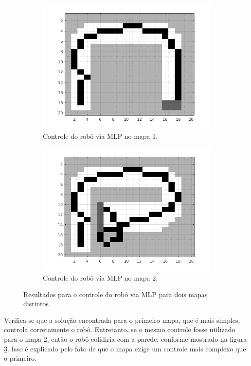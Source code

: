 	\begin{figure}[h!]
	
	\centering
	
		\begin{subfigure}{.5\textwidth}
		  \centering
		  \includegraphics[width=1\linewidth]{mlp_robot/mlp_1_2}
		  \caption{\centering Controle do robô via MLP no mapa 1.}
		  \label{fig:mlp_2_1}
		  
		\end{subfigure}%
		\begin{subfigure}{.5\textwidth}
		  \centering
		  \includegraphics[width=1\linewidth]{mlp_robot/mlp_2_2}
		  \caption{\centering Controle do robô via MLP no mapa 2.}
		  \label{fig:mlp_2_2} 
		\end{subfigure}
	
	
	\caption{Resultados para o controle do robô via MLP
	para dois mapas distintos.}
	\end{figure} 
	
	\FloatBarrier
	
Verifica-se que a solução encontrada para o primeiro mapa, que é mais simples,
controla corretamente o robô. Entretanto, se o mesmo controle fosse utilizado
para o mapa 2, então o robô colidiria com a parede, conforme mostrado na figura
\ref{fig:mlp_2_2}. Isso é explicado pelo fato de que o mapa exige um controle
mais complexo que o primeiro.
